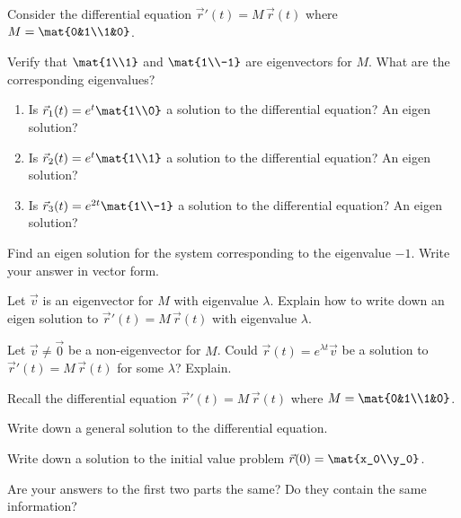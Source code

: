 \documentclass{workbook}
\begin{document}
\begin{slide}
	\question
	Consider the differential equation $\vec r'(t) = M\,\vec r(t)$ where $M=\mat{0&1\\1&0}$.

	\begin{parts}
		\item Verify that $\mat{1\\1}$ and $\mat{1\\-1}$ are eigenvectors for $M$. What are the
		corresponding eigenvalues?
		\item 
		\begin{enumerate}
			\item Is $\vec r_1(t) =e^t \mat{1\\0}$ a solution to the differential equation? An eigen solution?
			\item Is $\vec r_2(t) =e^t \mat{1\\1}$ a solution to the differential equation? An eigen solution?
			\item Is $\vec r_3(t) =e^{2t} \mat{1\\-1}$ a solution to the differential equation? An eigen solution?
		\end{enumerate}

		\item Find an eigen solution for the system corresponding to the eigenvalue $-1$. Write your answer
		in vector form.

		\item Let $\vec v$ is an eigenvector for $M$ with eigenvalue $\lambda$. Explain how to write down an eigen solution
		to $\vec r'(t) = M\,\vec r(t)$ with eigenvalue $\lambda$.

		\item Let $\vec v\neq \vec 0$ be a non-eigenvector for $M$. Could $\vec r(t)=e^{\lambda t}\vec v$ be a solution
		to $\vec r'(t) = M\,\vec r(t)$ for some $\lambda$? Explain.
	\end{parts}
\end{slide}

\begin{slide}
	\question
	Recall the differential equation $\vec r'(t) = M\,\vec r(t)$ where $M=\mat{0&1\\1&0}$.

	\begin{parts}
		\item Write down a general solution to the differential equation.
		\item Write down a solution to the initial value problem $\vec r(0)=\mat{x_0\\y_0}$.
		\item Are your answers to the first two parts the same? Do they contain the same information?
	\end{parts}
\end{slide}
\end{document}
